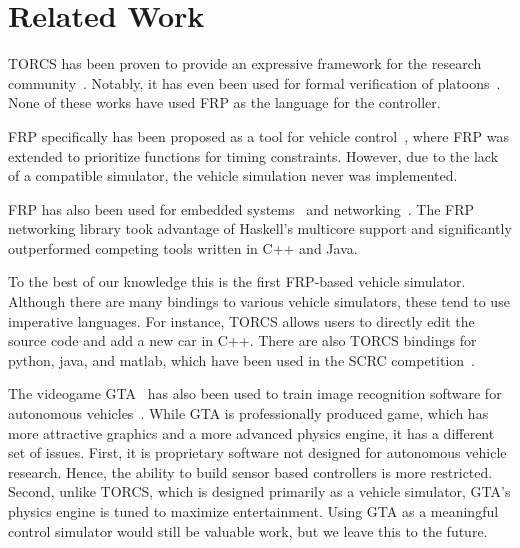 \section{Related Work}

TORCS has been proven to provide an expressive framework for the research community~\cite{OnievaPAMP09,conf/cig/CardamoneLL09,conf/cig/MunozGS10}. 
Notably, it has even been used for formal verification of platoons~\cite{kamali2016formal,xu2016experimental}. 
None of these works have used FRP as the language for the controller.


FRP specifically has been proposed as a tool for vehicle control~\cite{kazemi2016,zou2016}, where FRP was extended to prioritize functions for timing constraints. However, due to the lack of a compatible simulator, the vehicle simulation never was implemented. 

FRP has also been used for embedded systems~\cite{helbling2016juniper} and networking~\cite{voellmy2012scalable}.
The FRP networking library took advantage of Haskell's multicore support and significantly outperformed competing tools written in C++ and Java.


To the best of our knowledge this is the first FRP-based vehicle simulator.
Although there are many bindings to various vehicle simulators, these tend to use imperative languages.
For instance, TORCS allows users to directly edit the source code and add a new car in C++.
There are also TORCS bindings for python, java, and matlab, which have been used in the SCRC competition~\cite{SCRC}.

The videogame GTA~\cite{} has also been used to train image recognition software for autonomous vehicles~\cite{}.
While GTA is professionally produced game, which has more attractive graphics and a more advanced physics engine, it has a different set of issues.
First, it is proprietary software not designed for autonomous vehicle research. 
Hence, the ability to build sensor based controllers is more restricted. 
Second, unlike TORCS, which is designed primarily as a vehicle simulator, GTA's physics engine is tuned to maximize entertainment.
Using GTA as a meaningful control simulator would still be valuable work, but we leave this to the future.
